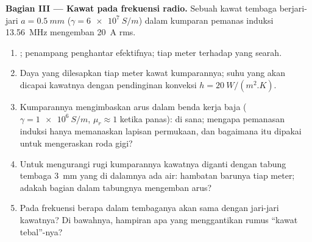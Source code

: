 \begin{problem}
\medskip
\noindent\textbf{Bagian III --- Kawat pada frekuensi radio.}
Sebuah kawat tembaga berjari-jari $a = \qty{0.5}{mm}$ ($\gamma = \qty{6e7}{S/m}$) dalam kumparan
pemanas induksi \qty{13.56}{MHz} mengemban \qty{20}{A} rms.
\begin{enumerate}[resume]
  \item {}; penampang penghantar efektifnya;  tiap
        meter terhadap yang searah.
  \item Daya yang dilesapkan tiap meter kawat kumparannya; suhu yang akan
        dicapai kawatnya dengan pendinginan konveksi $h = \qty{20}{W/(m^2.K)}$.
  \item Kumparannya mengimbaskan arus dalam benda kerja baja ($\gamma =
        \qty{1e6}{S/m}$, $\mu_r \approx 1$ ketika panas):  di sana; mengapa
        pemanasan induksi hanya memanaskan lapisan permukaan, dan bagaimana itu
        dipakai untuk mengeraskan roda gigi?
  \item Untuk mengurangi rugi kumparannya kawatnya diganti dengan tabung
        tembaga \qty{3}{mm} yang di dalamnya ada air: hambatan barunya tiap meter; adakah
        bagian dalam tabungnya mengemban arus?
  \item Pada frekuensi berapa  dalam tembaganya akan sama dengan
        jari-jari kawatnya? Di bawahnya, hampiran apa yang menggantikan
        rumus ``kawat tebal''-nya?
\end{enumerate}


\end{problem}
